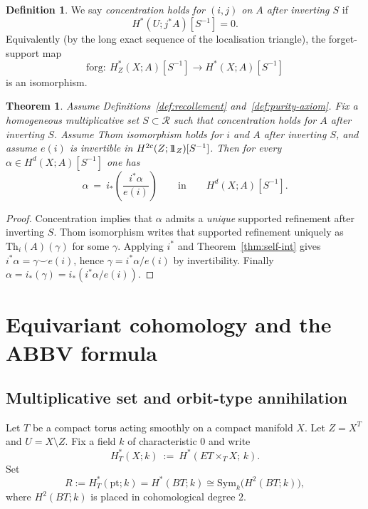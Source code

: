 \documentclass[10pt,a4paper,dvipsnames,x11names]{amsart}
\newcommand{\one}{1\hskip-3.5pt1}
\newcommand{\pt}{\mathrm{pt}}
\newcommand{\forg}{\mathrm{forg}}
\newcommand{\Th}{\mathrm{Th}}
\numberwithin{equation}{section}
\theoremstyle{plain}
\newtheorem{theorem}{Theorem}[section]
\theoremstyle{definition}
\newtheorem{definition}[definition]{Definition}
\theoremstyle{remark}
\begin{document}
\begin{definition} \label{def:conc}
We say \emph{concentration holds for $(i,j)$ on $A$ after inverting $S$} if
$$
H^*(U;j^*A)[S^{-1}]=0.
$$
Equivalently (by the long exact sequence of the localisation triangle), the forget-support map
$$
\forg:\ H_Z^*(X;A)[S^{-1}]\longrightarrow H^*(X;A)[S^{-1}]
$$
is an isomorphism.
\end{definition}

\begin{theorem} \label{thm:universal-euler}
Assume Definitions~\ref{def:recollement} and~\ref{def:purity-axiom}.
Fix a homogeneous multiplicative set $S\subset\mathscr R$ such that concentration holds for $A$ after inverting $S$.
Assume Thom isomorphism holds for $i$ and $A$ after inverting $S$, and assume $e(i)$ is invertible in
$H^{2c}(Z;\one_Z)[S^{-1}]$.
Then for every $\alpha\in H^d(X;A)[S^{-1}]$ one has
$$
\alpha\ =\ i_*\!\left(\frac{i^*\alpha}{e(i)}\right)
\qquad\text{in}\qquad
H^d(X;A)[S^{-1}].
$$
\end{theorem}

\begin{proof}
Concentration implies that $\alpha$ admits a \emph{unique} supported refinement after inverting $S$.
Thom isomorphism writes that supported refinement uniquely as $\Th_i(A)(\gamma)$ for some $\gamma$.
Applying $i^*$ and Theorem~\ref{thm:self-int} gives $i^*\alpha=\gamma\smile e(i)$, hence $\gamma=i^*\alpha/e(i)$ by invertibility.
Finally $\alpha=i_*(\gamma)=i_*(i^*\alpha/e(i))$.
\end{proof}

\section{Equivariant cohomology and the ABBV formula}\label{sec:borel}

\subsection{Multiplicative set and orbit-type annihilation}

Let $T$ be a compact torus acting smoothly on a compact manifold $X$.
Let $Z=X^T$ and $U=X\setminus Z$.
Fix a field $k$ of characteristic $0$ and write
$$
H_T^*(X;k)\ :=\ H^*(ET\times_T X;\,k).
$$
Set
\[
R:=H_T^*(\pt;k)=H^*(BT;k)\cong\mathrm{Sym}_k\bigl(H^2(BT;k)\bigr),
\]
where $H^2(BT;k)$ is placed in cohomological degree $2$.
\end{document}
